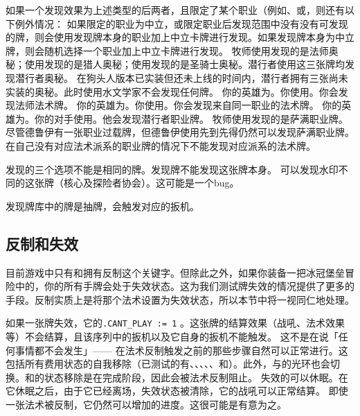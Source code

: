 如果一个发现效果为上述类型的后两者，且限定了某个职业（例如、或，则还有以下例外情况：
\notice 如果限定的职业为中立，或限定职业后发现范围中没有没有可发现的牌，则会使用发现牌本身的职业加上中立卡牌进行发现。如果发现牌本身为中立牌，则会随机选择一个职业加上中立卡牌进行发现。
\example 牧师使用发现的是法师奥秘；使用发现的是猎人奥秘；使用发现的是圣骑士奥秘。潜行者使用这三张牌均发现潜行者奥秘。
\history {} 在狗头人版本已实装但还未上线的时间内，潜行者拥有三张尚未实装的奥秘。此时使用水文学家不会发现任何牌。
\example 你的英雄为。你使用。你会发现法师法术牌。
\example 你的英雄为。你使用。你会发现来自同一职业的法术牌。
\example 你的英雄为。你的对手使用。他会发现潜行者职业牌。
\example 牧师使用发现的是萨满职业牌。
\exception 尽管德鲁伊有一张职业过载牌，但德鲁伊使用先到先得仍然可以发现萨满职业牌。
\exception {}在自己没有对应法术派系的职业牌的情况下不能发现对应派系的法术牌。

发现的三个选项不能是相同的牌。发现牌不能发现这张牌本身。
\notice {}可以发现水印不同的这张牌（核心及探险者协会）。这可能是一个bug。

发现牌库中的牌是抽牌，会触发对应的扳机。

\subsection{反制和失效}
\label{counter}

目前游戏中只有和拥有反制这个关键字。但除此之外，如果你装备一把冰冠堡垒冒险中的，你的所有手牌会处于失效状态。这为我们测试牌失效的情况提供了更多的手段。反制实质上是将那个法术设置为失效状态，所以本节中将一视同仁地处理。

如果一张牌失效，它的\texttt{.CANT\_PLAY := 1} 。这张牌的结算效果（战吼、法术效果等）不会结算，且该序列中的扳机以及它自身的扳机不能触发。
\notice 这不是在说「任何事情都不会发生」—— 在法术反制触发之前的那些步骤自然可以正常进行。这包括所有费用状态的自我移除（已测试的有、、、、、和）。此外，与的光环也会切换。和的状态移除是在完成阶段，因此会被法术反制阻止。
\exception {}失效的可以休眠。在它休眠之后，由于它已经离场，失效状态被清除，它的战吼可以正常结算。
\exception {} 即使一张法术被反制，它仍然可以增加的进度。这很可能是有意为之。

